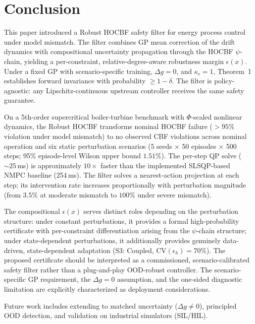 \section{Conclusion}
\label{sec:conclusion}

This paper introduced a Robust HOCBF safety filter for energy process control under model mismatch. The filter combines GP mean correction of the drift dynamics with compositional uncertainty propagation through the HOCBF $\psi$-chain, yielding a per-constraint, relative-degree-aware robustness margin $\epsilon(x)$. Under a fixed GP with scenario-specific training, $\Delta g = 0$, and $\kappa_\epsilon = 1$, Theorem~1 establishes forward invariance with probability $\geq 1-\delta$. The filter is policy-agnostic: any Lipschitz-continuous upstream controller receives the same safety guarantee.

On a 5th-order supercritical boiler-turbine benchmark with $\Phi$-scaled nonlinear dynamics, the Robust HOCBF transforms nominal HOCBF failure ($>95\%$ violation under model mismatch) to no observed CBF violations across nominal operation and six static perturbation scenarios (5 seeds $\times$ 50 episodes $\times$ 500 steps; 95\% episode-level Wilson upper bound $1.51\%$). The per-step QP solve (${\sim}25$\,ms) is approximately $10\times$ faster than the implemented SLSQP-based NMPC baseline (254\,ms). The filter solves a nearest-action projection at each step; its intervention rate increases proportionally with perturbation magnitude (from $3.5\%$ at moderate mismatch to $100\%$ under severe mismatch).

The compositional $\epsilon(x)$ serves distinct roles depending on the perturbation structure: under constant perturbations, it provides a formal high-probability certificate with per-constraint differentiation arising from the $\psi$-chain structure; under state-dependent perturbations, it additionally provides genuinely data-driven, state-dependent adaptation (S3: Coupled, $\mathrm{CV}(\epsilon_h)=70\%$). The proposed certificate should be interpreted as a commissioned, scenario-calibrated safety filter rather than a plug-and-play OOD-robust controller. The scenario-specific GP requirement, the $\Delta g = 0$ assumption, and the one-sided diagnostic limitation are explicitly characterized as deployment considerations.

Future work includes extending to matched uncertainty ($\Delta g \neq 0$), principled OOD detection, and validation on industrial simulators (SIL/HIL).
